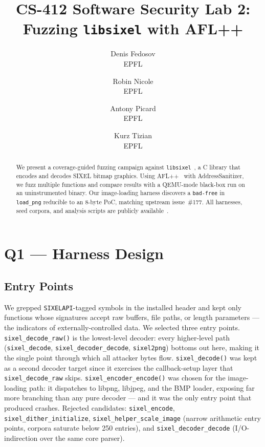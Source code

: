 \documentclass[letterpaper,twocolumn,10pt]{article}
\begin{document}
\date{}
\title{\Large \bf CS-412 Software Security Lab 2:\\
  Fuzzing \texttt{libsixel} with AFL++}
\author{
{\rm Denis Fedosov}\\
EPFL
\and
{\rm Robin Nicole}\\
EPFL
\and
{\rm Antony Picard}\\
EPFL
\and
{\rm Kurz Tizian}\\
EPFL
}
\maketitle

\begin{abstract}
We present a coverage-guided fuzzing campaign against \texttt{libsixel}~\cite{libsixel},
a C library that encodes and decodes SIXEL bitmap graphics. Using AFL++~\cite{aflpp}
with AddressSanitizer, we fuzz multiple functions and compare results with a
QEMU-mode black-box run on an uninstrumented binary. Our image-loading harness
discovers a \texttt{bad-free} in \texttt{load\_png} reducible to an 8-byte PoC,
matching upstream issue~\#177. All harnesses, seed corpora, and
analysis scripts are publicly available~\cite{ourimpl}.
\end{abstract}

\section{Q1 --- Harness Design}

\subsection{Entry Points}
We grepped \texttt{SIXELAPI}-tagged symbols in the installed header and kept only
functions whose signatures accept raw buffers, file paths, or length parameters
--- the indicators of externally-controlled data. We selected three entry points.
\texttt{sixel\_decode\_raw()} is the lowest-level decoder: every higher-level
path (\texttt{sixel\_decode}, \texttt{sixel\_decoder\_decode}, \texttt{sixel2png})
bottoms out here, making it the single point through which all attacker bytes
flow. \texttt{sixel\_decode()} was kept as a second decoder target since it
exercises the callback-setup layer that \texttt{sixel\_decode\_raw} skips.
\texttt{sixel\_encoder\_encode()} was chosen for the image-loading path: it
dispatches to libpng, libjpeg, and the BMP loader, exposing far more branching
than any pure decoder --- and it was the only entry point that produced crashes.
Rejected candidates: \texttt{sixel\_encode}, \texttt{sixel\_dither\_initialize},
\texttt{sixel\_helper\_scale\_image} (narrow arithmetic entry points, corpora
saturate below 250 entries), and \texttt{sixel\_decoder\_decode} (I/O-indirection
over the same core parser).
\end{document}
